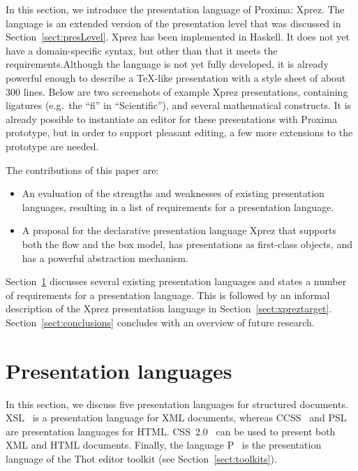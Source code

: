 In this section, we introduce the presentation language of Proxima: {\sc Xprez}. The language is an extended version of the presentation level that was discussed in Section~\ref{sect:presLevel}. {\sc Xprez}  has been implemented in Haskell. \bc It does not yet have a domain-specific syntax, but other than that it meets the requirements.\ec Although the language is not yet fully developed, it is already powerful enough to describe a \TeX -like presentation with a style sheet of about 300 lines. Below are two screenshots of example {\sc Xprez} presentations, containing ligatures (e.g.\ the ``fi'' in ``Scientific''), and several mathematical constructs. It is already possible to instantiate an editor for these presentations with Proxima prototype, but in order to support pleasant editing, a few more extensions to the prototype are needed.

\begin{center}
 \qquad
{}
\end{center}


\bc
The contributions of this paper are:

\begin{itemize}
\item An evaluation of the strengths and weaknesses of existing presentation languages, resulting in a list of requirements for a presentation language.
\item A proposal for the declarative presentation language {\sc Xprez} that supports both the flow and the box model, has presentations as first-class objects, and has a powerful abstraction mechanism.
\end{itemize}
\ec

Section~\ref{sect:targetlangs} discusses several existing presentation languages and states a number of requirements for a presentation language. This is followed by an informal description of the {\sc Xprez} presentation language in Section~\ref{sect:xpreztarget}. Section~\ref{sect:conclusions} concludes with an overview of future research.


%																
%																
%																
\section{Presentation languages} \label{sect:targetlangs}

In this section, we discuss five presentation languages for structured documents. XSL~\cite{xsl10} is a presentation language for XML documents, whereas CCSS~\cite{badros99ccss} and PSL~\cite{marden98psl} are presentation languages for HTML. CSS~2.0~\cite{css2} can be used to present both XML and HTML documents. Finally, the language P~\cite{quint97thot} is the presentation language of the Thot editor toolkit (see Section~\ref{sect:toolkits}). 

